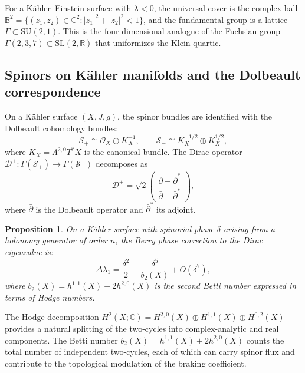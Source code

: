 \documentclass[12pt,a4paper]{article}
\newtheorem{proposition}[theorem]{Proposition}
\theoremstyle{definition}
\theoremstyle{remark}
\newcommand{\CC}{\mathbb{C}}
\newcommand{\RR}{\mathbb{R}}
\newcommand{\SL}{\mathrm{SL}}
\newcommand{\cD}{\mathcal{D}}
\newcommand{\cS}{\mathcal{S}}
\newcommand{\cO}{\mathcal{O}}
\newcommand{\SU}{\mathrm{SU}}
\begin{document}
For a K\"ahler--Einstein surface with $\lambda < 0$, the universal cover is the complex ball $\mathbb{B}^2 = \{(z_1, z_2) \in \CC^2 : |z_1|^2 + |z_2|^2 < 1\}$, and the fundamental group is a lattice $\Gamma \subset \SU(2, 1)$. This is the four-dimensional analogue of the Fuchsian group $\Gamma(2,3,7) \subset \SL(2, \RR)$ that uniformizes the Klein quartic.

\subsection{Spinors on K\"ahler manifolds and the Dolbeault correspondence}

On a K\"ahler surface $(X, J, g)$, the spinor bundles are identified with the Dolbeault cohomology bundles:
\begin{equation}
\cS_+ \cong \cO_X \oplus K_X^{-1}, \qquad \cS_- \cong K_X^{-1/2} \oplus K_X^{1/2},
\end{equation}
where $K_X = \Lambda^{2,0} T^*X$ is the canonical bundle. The Dirac operator $\cD^+ \colon \Gamma(\cS_+) \to \Gamma(\cS_-)$ decomposes as
\begin{equation}
\cD^+ = \sqrt{2} \begin{pmatrix} \bar\partial + \bar\partial^* \\ \bar\partial + \bar\partial^* \end{pmatrix},
\end{equation}
where $\bar\partial$ is the Dolbeault operator and $\bar\partial^*$ its adjoint.

\begin{proposition}
\label{prop:kahler-spinor}
On a K\"ahler surface with spinorial phase $\delta$ arising from a holonomy generator of order $n$, the Berry phase correction to the Dirac eigenvalue is:
\begin{equation}
\Delta\lambda_1 = \frac{\delta^2}{2} - \frac{\delta^5}{b_2(X)} + O(\delta^7),
\end{equation}
where $b_2(X) = h^{1,1}(X) + 2h^{2,0}(X)$ is the second Betti number expressed in terms of Hodge numbers.
\end{proposition}

The Hodge decomposition $H^2(X; \CC) = H^{2,0}(X) \oplus H^{1,1}(X) \oplus H^{0,2}(X)$ provides a natural splitting of the two-cycles into complex-analytic and real components. The Betti number $b_2(X) = h^{1,1}(X) + 2h^{2,0}(X)$ counts the total number of independent two-cycles, each of which can carry spinor flux and contribute to the topological modulation of the braking coefficient.
\end{document}
